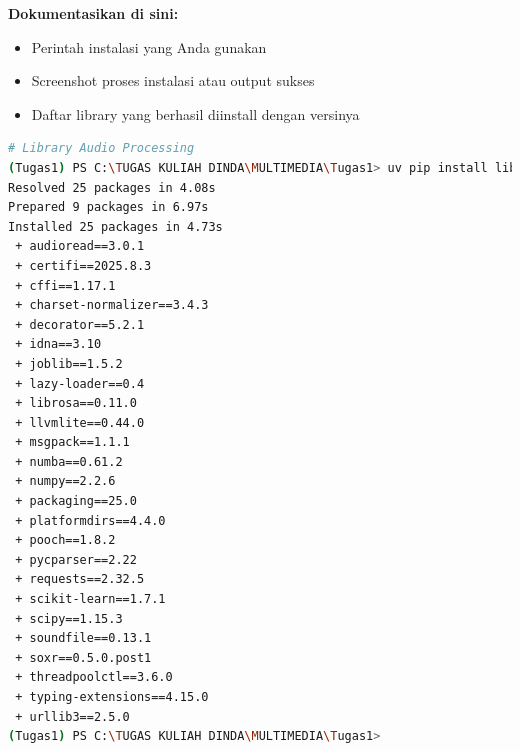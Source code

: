 \documentclass[11pt,a4paper]{article}
\begin{document}
\textbf{Dokumentasikan di sini:}
\begin{itemize}
    \item Perintah instalasi yang Anda gunakan
    \item Screenshot proses instalasi atau output sukses
    \item Daftar library yang berhasil diinstall dengan versinya
\end{itemize}
\begin{lstlisting}[language=bash, caption=Instalasi library audio]
# Library Audio Processing
(Tugas1) PS C:\TUGAS KULIAH DINDA\MULTIMEDIA\Tugas1> uv pip install librosa soundfile scipy 
Resolved 25 packages in 4.08s                                                                                                                                                     
Prepared 9 packages in 6.97s
Installed 25 packages in 4.73s
 + audioread==3.0.1                                                                                                                                                               
 + certifi==2025.8.3                                                                                                                                                              
 + cffi==1.17.1                                                                                                                                                                   
 + charset-normalizer==3.4.3                                                                                                                                                      
 + decorator==5.2.1                                                                                                                                                               
 + idna==3.10                                                                                                                                                                     
 + joblib==1.5.2                                                                                                                                                                  
 + lazy-loader==0.4                                                                                                                                                               
 + librosa==0.11.0
 + llvmlite==0.44.0
 + msgpack==1.1.1
 + numba==0.61.2
 + numpy==2.2.6
 + packaging==25.0
 + platformdirs==4.4.0
 + pooch==1.8.2
 + pycparser==2.22
 + requests==2.32.5
 + scikit-learn==1.7.1
 + scipy==1.15.3
 + soundfile==0.13.1
 + soxr==0.5.0.post1
 + threadpoolctl==3.6.0
 + typing-extensions==4.15.0
 + urllib3==2.5.0
(Tugas1) PS C:\TUGAS KULIAH DINDA\MULTIMEDIA\Tugas1> 
\end{lstlisting}
\end{document}

